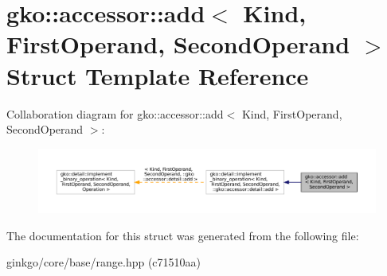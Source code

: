 \hypertarget{structgko_1_1accessor_1_1add}{}\section{gko\+:\+:accessor\+:\+:add$<$ Kind, First\+Operand, Second\+Operand $>$ Struct Template Reference}
\label{structgko_1_1accessor_1_1add}


Collaboration diagram for gko\+:\+:accessor\+:\+:add$<$ Kind, First\+Operand, Second\+Operand $>$\+:
\nopagebreak
\begin{figure}[H]
\begin{center}
\leavevmode
\includegraphics[width=350pt]{structgko_1_1accessor_1_1add__coll__graph}
\end{center}
\end{figure}


The documentation for this struct was generated from the following file\+:\begin{DoxyCompactItemize}
\item 
ginkgo/core/base/range.\+hpp (c71510aa)\end{DoxyCompactItemize}
